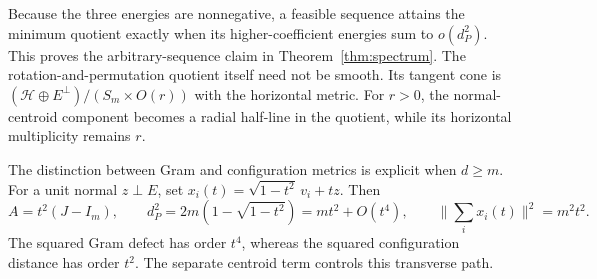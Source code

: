 \documentclass[11pt]{article}
\theoremstyle{remark}\newtheorem{remark}[theorem]{Remark}
\begin{document}
Because the three energies are nonnegative, a feasible sequence attains the
minimum quotient exactly when its higher-coefficient energies sum to
$o(d_P^2)$. This proves the arbitrary-sequence claim in
Theorem~\ref{thm:spectrum}. The rotation-and-permutation quotient itself
need not be smooth. Its tangent cone is
$(\mathcal H\oplus E^\perp)/(S_m\times O(r))$ with the horizontal metric.
For $r>0$, the normal-centroid component becomes a radial half-line in the
quotient, while its horizontal multiplicity remains $r$.

The distinction between Gram and configuration metrics is explicit when
$d\ge m$. For a unit normal $z\perp E$, set
$x_i(t)=\sqrt{1-t^2}\,v_i+tz$. Then
\[
 A=t^2(J-I_m),\qquad
 d_P^2=2m(1-\sqrt{1-t^2})=mt^2+O(t^4),\qquad
 \Big\|\sum_i x_i(t)\Big\|^2=m^2t^2.
\]
The squared Gram defect has order $t^4$, whereas the squared configuration
distance has order $t^2$. The separate centroid term controls this transverse path.
\end{document}
